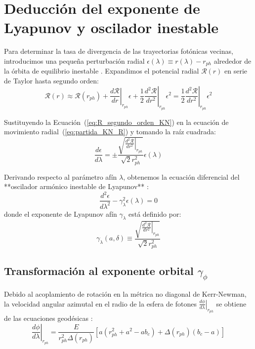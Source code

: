 \section{Deducción del exponente de Lyapunov y oscilador inestable}
Para determinar la tasa de divergencia de las trayectorias fotónicas vecinas, introducimos una pequeña perturbación radial $\epsilon(\lambda) \equiv r(\lambda) - r_{ph}$ alrededor de la órbita de equilibrio inestable \citep{Sneppen, chaos_fractals_photon_ring}. Expandimos el potencial radial $\mathcal{R}(r)$ en serie de Taylor hasta segundo orden:
\begin{equation}
    \mathcal{R}(r) \approx \mathcal{R}(r_{ph}) + \left.\frac{d\mathcal{R}}{dr}\right|_{r_{ph}} \epsilon + \frac{1}{2} \left.\frac{d^2\mathcal{R}}{dr^2}\right|_{r_{ph}} \epsilon^2 = \frac{1}{2} \left.\frac{d^2\mathcal{R}}{dr^2}\right|_{r_{ph}} \epsilon^2
    \label{eq:R_segundo_orden_KN}
\end{equation}

Sustituyendo la Ecuación~(\ref{eq:R_segundo_orden_KN}) en la ecuación de movimiento radial~(\ref{eq:partida_KN_R}) y tomando la raíz cuadrada:
\begin{equation}
    \frac{d\epsilon}{d\lambda} = \pm \frac{\sqrt{\left.\frac{d^2\mathcal{R}}{dr^2}\right|_{r_{ph}}}}{\sqrt{2} r_{ph}^2} \epsilon(\lambda)
    \label{eq:d_epsilon_lambda_KN}
\end{equation}

Derivando respecto al parámetro afín $\lambda$, obtenemos la ecuación diferencial del **oscilador armónico inestable de Lyapunov** \citep{Sneppen, 2406.09498v1}:
\begin{equation}
    \frac{d^2\epsilon}{d\lambda^2} - \gamma_\lambda^2 \epsilon(\lambda) = 0
    \label{eq:oscilador_lyapunov_SI_KN}
\end{equation}
donde el exponente de Lyapunov afín $\gamma_\lambda$ está definido por:
\begin{equation}
    \gamma_\lambda(a, \delta) \equiv \frac{\sqrt{\left.\frac{d^2\mathcal{R}}{dr^2}\right|_{r_{ph}}}}{\sqrt{2} r_{ph}^2}
    \label{eq:def_gamma_lambda_KN}
\end{equation}

\subsection{Transformación al exponente orbital \texorpdfstring{$\gamma_\phi$}{gamma\_phi}}
Debido al acoplamiento de rotación en la métrica no diagonal de Kerr-Newman, la velocidad angular azimutal en el radio de la esfera de fotones $\left.\frac{d\phi}{d\lambda}\right|_{r_{ph}}$ se obtiene de las ecuaciones geodésicas \citep{Carroll, Chandrasekhar}:
\begin{equation}
    \left.\frac{d\phi}{d\lambda}\right|_{r_{ph}} = \frac{E}{r_{ph}^2 \Delta(r_{ph})} \left[ a \left( r_{ph}^2 + a^2 - a b_c \right) + \Delta(r_{ph}) \left( b_c - a \right) \right]
    \label{eq:dphi_dlambda_KN}
\end{equation}

